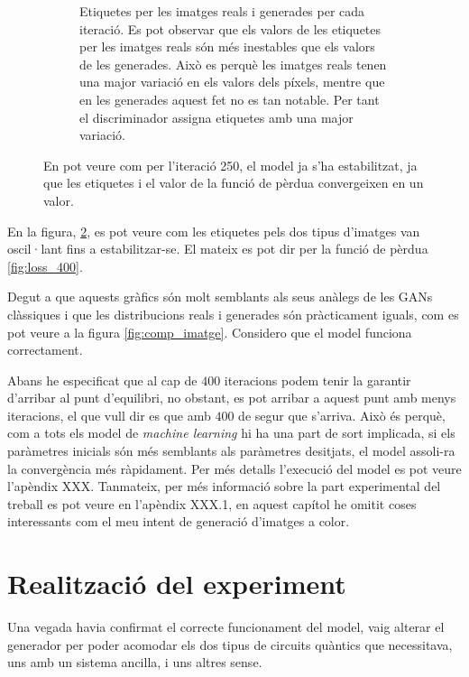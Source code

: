 \begin{figure}
\begin{subfigure}{0.45\textwidth}
		\caption{Etiquetes per les imatges reals i generades per cada iteració. Es pot observar que els valors de les etiquetes per les imatges reals són més inestables que els valors de les generades. Això es perquè les imatges reals tenen una major variació en els valors dels píxels, mentre que en les generades aquest fet no es tan notable. Per tant el discriminador assigna etiquetes amb una major variació.} \label{fig:labels_400}
	\end{subfigure}%
	\hspace*{\fill}
	\caption{En pot veure com per l'iteració 250, el model ja s'ha estabilitzat, ja que les etiquetes i el valor de la funció de pèrdua convergeixen en un valor.}%
\end{figure}

En la figura, \ref{fig:labels_400}, es pot veure com les etiquetes pels dos tipus d'imatges van oscil·lant fins a estabilitzar-se. El mateix es pot dir per la funció de pèrdua \ref{fig:loss_400}.  

Degut a que aquests gràfics són molt semblants als seus anàlegs de les GANs clàssiques i que les distribucions reals i generades són pràcticament iguals, com es pot veure a la figura \ref{fig:comp_imatge}. Considero que el model funciona correctament. 



Abans he especificat que al cap de $400$ iteracions podem tenir la garantir d'arribar al punt d'equilibri, no obstant, es pot arribar a aquest punt amb menys iteracions, el que vull dir es que amb $400$ de segur que s'arriva. Això és perquè, com a tots els model de \textit{machine learning} hi ha una part de sort implicada, si els paràmetres inicials són més semblants als paràmetres desitjats, el model assoli-ra la convergència més ràpidament. Per més detalls l'execució del model es pot veure l'apèndix XXX. Tanmateix, per més informació sobre la part experimental del treball es pot veure en l'apèndix XXX.1, en aquest capítol he omitit coses interessants com el meu intent de generació d'imatges a color. 
 
\chapter{Realització del experiment} 

Una vegada havia confirmat el correcte funcionament del model, vaig alterar el generador per poder acomodar els dos tipus de circuits quàntics que necessitava, uns amb un sistema ancilla, i uns altres sense.

